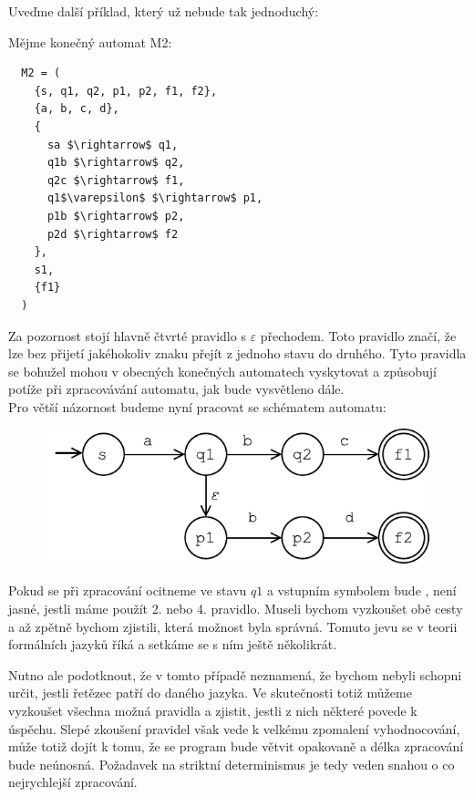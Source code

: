 \noindent
Uveďme další příklad, který už nebude tak jednoduchý:
\begin{exmp}
  Mějme konečný automat M2:
  \begin{lstlisting}
  M2 = (
    {s, q1, q2, p1, p2, f1, f2},
    {a, b, c, d},
    {
      sa $\rightarrow$ q1,
      q1b $\rightarrow$ q2,
      q2c $\rightarrow$ f1,
      q1$\varepsilon$ $\rightarrow$ p1,
      p1b $\rightarrow$ p2,
      p2d $\rightarrow$ f2
    },
    s1,
    {f1}
  )
  \end{lstlisting}

  Za pozornost stojí hlavně čtvrté pravidlo s $\varepsilon$ přechodem.
  Toto pravidlo značí, že lze bez přijetí jakéhokoliv znaku přejít z jednoho stavu
  do druhého. Tyto pravidla se bohužel mohou v obecných konečných automatech vyskytovat a
  způsobují potíže při zpracovávání automatu, jak bude vysvětleno dále.\\

  \noindent
  Pro větší názornost budeme nyní pracovat se schématem automatu:

  \begin{figure}[H]
    \centering
    \includegraphics{fig/finiteAutomat1.pdf}
  \end{figure}

  Pokud se při zpracování ocitneme ve stavu $q1$ a vstupním symbolem bude ,
  není jasné, jestli máme použít 2. nebo 4. pravidlo. Museli bychom vyzkoušet obě cesty
  a až zpětně bychom zjistili, která možnost byla správná. Tomuto jevu se v teorii
  formálních jazyků říká  a setkáme
  se s ním ještě několikrát.\\
\end{exmp}

  Nutno ale podotknout, že v tomto případě  neznamená,
  že bychom nebyli schopni
  určit, jestli řetězec patří do daného jazyka. Ve skutečnosti totiž můžeme
  vyzkoušet všechna možná pravidla a zjistit, jestli z nich některé povede k úspěchu.
  Slepé zkoušení pravidel však vede k velkému zpomalení vyhodnocování,
  může totiž dojít k tomu, že se program bude větvit opakovaně
  a délka zpracování bude neúnosná. Požadavek na striktní determinismus
  je tedy veden snahou o co nejrychlejší zpracování.


